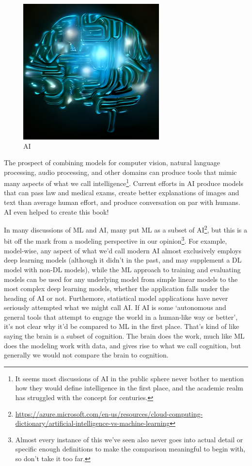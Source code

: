 \documentclass[
  letterpaper,
]{krantz}
\DeclareRobustCommand{\href}[2]{#2\footnote{\url{#1}}}
\begin{document}
\begin{figure}

{\centering \includegraphics[width=0.66\textwidth,height=\textheight]{img/ai_by_dalle.jpeg}

}

\caption{AI}

\end{figure}

The prospect of combining models for computer vision, natural language
processing, audio processing, and other domains can produce tools that
mimic many aspects of what we call intelligence\footnote{It seems most
  discussions of AI in the public sphere never bother to mention how
  they would define intelligence in the first place, and the academic
  realm has struggled with the concept for centuries.}. Current efforts
in AI produce models that can pass law and medical exams, create better
explanations of images and text than average human effort, and produce
conversation on par with humans. AI even helped to create this book!

In many discussions of ML and AI,
\href{https://azure.microsoft.com/en-us/resources/cloud-computing-dictionary/artificial-intelligence-vs-machine-learning}{many
put ML as a subset of AI}, but this is a bit off the mark from a
modeling perspective in our opinion\footnote{Almost every instance of
  this we've seen also never goes into actual detail or specific enough
  definitions to make the comparison meaningful to begin with, so don't
  take it too far.}. For example, model-wise, any aspect of what we'd
call modern AI almost exclusively employs deep learning models (although
it didn't in the past, and may supplement a DL model with non-DL
models), while the ML approach to training and evaluating models can be
used for any underlying model from simple linear models to the most
complex deep learning models, whether the application falls under the
heading of AI or not. Furthemore, statistical model applications have
never seriously attempted what we might call AI. If AI is some
`autonomous and general tools that attempt to engage the world in a
human-like way or better', it's not clear why it'd be compared to ML in
the first place. That's kind of like saying the brain is a subset of
cognition. The brain does the work, much like ML does the modeling work
with data, and gives rise to what we call cognition, but generally we
would not compare the brain to cognition.
\end{document}
